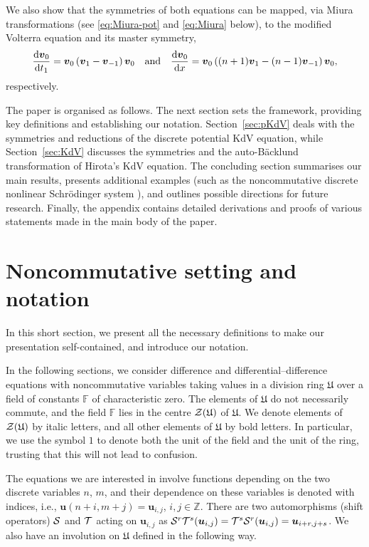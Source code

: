 \documentclass[dvips,10pt]{article}
\newcommand{\bs}{\boldsymbol}
\newcommand{\bsu}{ {\bs{u}}}
\theoremstyle{remark} %
\begin{document}
	We also show that the symmetries of both equations can be mapped, via Miura transformations (see \eqref{eq:Miura-pot} and \eqref{eq:Miura} below), to the modified Volterra equation \cite{Bog} and its master symmetry,
	\begin{equation*}
		\frac{{\rm{d}} {\bs{v}}_{0}}{{\rm{d}} t_1} =   {\bs{v}}_{0} \left( {\bs{v}}_{1} - {\bs{v}}_{-1}\right) {\bs{v}}_{0} ~~~ {\mbox{and}} ~~~ \frac{{\rm{d}} {\bs{v}}_{0}}{{\rm{d}} x} =   {\bs{v}}_{0} \left( (n+1) {\bs{v}}_{1} - (n-1) {\bs{v}}_{-1}\right) {\bs{v}}_{0},
	\end{equation*}
	respectively.
			
	The paper is organised as follows. The next section sets the framework, providing key definitions and establishing our notation. Section~\ref{sec:pKdV} deals with the symmetries and reductions of the discrete potential KdV equation, while Section~\ref{sec:KdV} discusses the symmetries and the auto-B\"acklund transformation of Hirota's KdV equation. The concluding section summarises our main results, presents additional examples (such as the noncommutative discrete nonlinear Schr\"odinger system \cite{KRX}), and outlines possible directions for future research. Finally, the appendix contains detailed derivations and proofs of various statements made in the main body of the paper.
	
	
	\section{Noncommutative setting and notation} \label{sec:notation}
	
	In this short section, we present all the necessary definitions to make our presentation self-contained, and introduce our notation. 
	
	In the following sections, we consider difference and differential--difference equations with noncommutative variables taking values in a division ring ${\mathfrak{U}}$ over a field of constants $\mathbb{F}$ of characteristic zero. The elements of ${\mathfrak{U}}$ do not necessarily commute, and the field $\mathbb{F}$ lies in the centre ${\cal{Z}}({\mathfrak{U}})$ of ${\mathfrak{U}}$. We denote elements of ${\cal{Z}}({\mathfrak{U}})$ by italic letters, and all other elements of ${\mathfrak{U}}$ by bold letters. In particular, we use the symbol $1$ to denote both the unit of the field and the unit of the ring, trusting that this will not lead to confusion.
	
	The equations we are interested in involve functions depending on the two discrete variables $n$, $m$, and their dependence on these variables is denoted with indices, i.e., $\bsu(n+i,m+j) = \bsu_{i,j}$, $i,j \in {\mathbb{Z}}$. There are two automorphisms (shift operators) $\cal{S}$ and $\cal{T}$ acting on $\bsu_{i,j}$ as ${\cal{S}}^r{\cal{T}}^s(\bsu_{i,j}) = {\cal{T}}^s{\cal{S}}^r(\bsu_{i,j}) =\bsu_{i+r,j+s}$. We also have an involution on $\mathfrak{U}$ defined in the following way.
	
\end{document}

